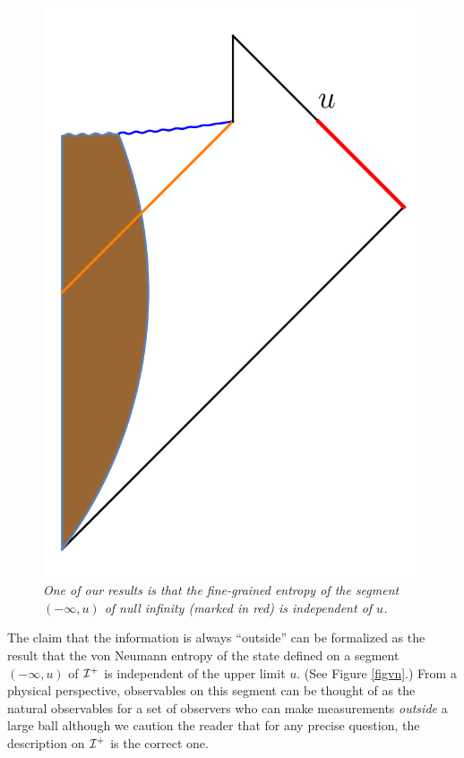 \documentclass[12pt]{article}
\def \scrip{{\cal I}^{+}}
\begin{document}
\begin{figure}[!ht]
\begin{center}
\includegraphics[height=0.5\textheight]{bottomalgebra.png}
\caption{\em One of our results is that the fine-grained entropy of the segment $(-\infty, u)$ of null infinity (marked in red) is independent of $u$.}
\end{center}
\end{figure}
The claim that the information is always ``outside'' can be formalized as the result that the von Neumann entropy of the state defined on a segment $(-\infty, u)$ of $\scrip$ is independent of the upper limit $u$. (See Figure \ref{figvn}.) From a physical perspective, observables on this segment can be thought of as the natural observables for a set of observers who can make measurements {\em outside} a large ball although we caution the reader that for any precise question, the description on $\scrip$ is the correct one.
\end{document}
